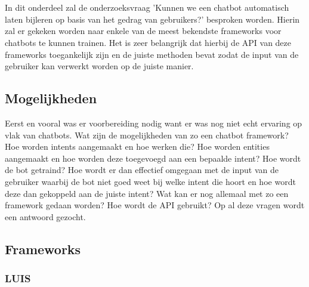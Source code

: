 
\chapter{}
\label{ch:methodologie}


In dit onderdeel zal de onderzoeksvraag 'Kunnen we een chatbot automatisch laten bijleren op basis van het gedrag van gebruikers?' besproken worden. Hierin zal er gekeken worden naar enkele van de meest bekendste frameworks voor chatbots te kunnen trainen. Het is zeer belangrijk dat hierbij de API van deze frameworks toegankelijk zijn en de juiste methoden bevat zodat de input van de gebruiker kan verwerkt worden op de juiste manier.

\section{Mogelijkheden}
\label{sec:Mogelijkheden}

Eerst en vooral was er voorbereiding nodig want er was nog niet echt ervaring op vlak van chatbots. Wat zijn de mogelijkheden van zo een chatbot framework? Hoe worden intents aangemaakt en hoe werken die? Hoe worden entities aangemaakt en hoe worden deze toegevoegd aan een bepaalde intent? Hoe wordt de bot getraind? Hoe wordt er dan effectief omgegaan met de input van de gebruiker waarbij de bot niet goed weet bij welke intent die hoort en hoe wordt deze dan gekoppeld aan de juiste intent? Wat kan er nog allemaal met zo een framework gedaan worden? Hoe wordt de API gebruikt? Op al deze vragen wordt een antwoord gezocht.

\section{Frameworks}
\label{sec:Frameworks}

\subsection{LUIS}
\label{Luis}

